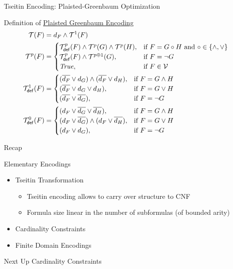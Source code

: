\documentclass[t]{sdqbeamer}
\begin{document}
\begin{frame}{Tseitin Encoding: Plaisted-Greenbaum Optimization}
\begin{block}{Definition of \href{http://dx.doi.org/10.1016/S0747-7171(86)80028-1}{Plaisted Greenbaum Encoding}}
	\vspace*{-3ex}
	\begin{align*}
	\tseitin{F} &= d_F \wedge \tseitinRec{F}{1}\\
	\tseitinRec{F}{p} &= \begin{cases}
			\tseitinDef{F}{p} \wedge \tseitinRec{G}{p} \wedge \tseitinRec{H}{p},
				& \text{if } F = G \circ H \text{ and } \circ \in \{\wedge, \vee\}\\
			\tseitinDef{F}{p} \wedge \tseitinRec{G}{p \oplus 1}, & \text{if } F = \neg G\\
			\true, & \text{if } F \in \allvars
		\end{cases}\\
	\tseitinDef{F}{1} &= \begin{cases}
			(\overline{d_F} \vee d_G) \wedge (\overline{d_F} \vee d_H), & \text{if } F = G \wedge H\\
			(\overline{d_F} \vee d_G \vee d_H), & \text{if } F = G \vee H\\
			(\overline{d_F} \vee \overline{d_G}), & \text{if } F = \neg G\\
			\end{cases}\\
	\tseitinDef{F}{0} &= \begin{cases}
			(d_F \vee \overline{d_G} \vee \overline{d_H}), & \text{if } F = G \wedge H\\
			(d_F \vee \overline{d_G}) \wedge (d_F \vee \overline{d_H}), & \text{if } F = G \vee H\\ 
			(d_F \vee d_G), & \text{if } F = \neg G
		\end{cases}
	\end{align*}
\end{block}
\end{frame}


\begin{frame}{Recap}

\begin{block}{Elementary Encodings}
	\begin{itemize}\setlength{\itemsep}{1em}
		\item Tseitin Transformation
		\begin{itemize}\setlength{\itemsep}{1ex}
			\item Tseitin encoding allows to carry over structure to CNF
			\item Formula size linear in the number of subformulas (of bounded arity)
		\end{itemize}
		\item Cardinality Constraints
		\item Finite Domain Encodings
	\end{itemize}
\end{block}
\pause
\begin{block}{Next Up}
	Cardinality Constraints
\end{block}

\end{frame}
\end{document}
